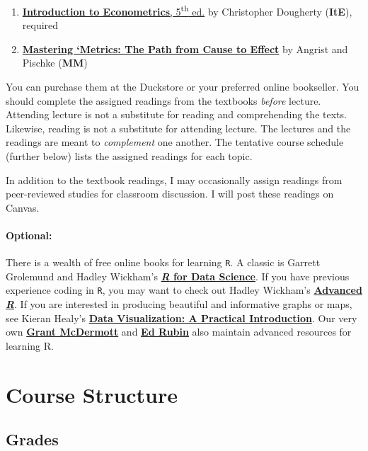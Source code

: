 \documentclass[10pt]{article}
\begin{document}
\begin{enumerate}
	\item \href{http://www.amazon.com/Introduction-Econometrics-Christopher-Dougherty/dp/0199676828/}{\textbf{Introduction to Econometrics}, 5\textsuperscript{th} ed.} by Christopher Dougherty (\textbf{ItE}), required
	\item \href{https://www.amazon.com/Mastering-Metrics-Path-Cause-Effect/dp/0691152845/}{\textbf{Mastering `Metrics: The Path from Cause to Effect}} by Angrist and Pischke (\textbf{MM})
\end{enumerate}
You can purchase them at the Duckstore or your preferred online bookseller. You should complete the assigned readings from the textbooks \textit{before} lecture. Attending lecture is not a substitute for reading and comprehending the texts. Likewise, reading is not a substitute for attending lecture. The lectures and the readings are meant to \textit{complement} one another. The tentative course schedule (further below) lists the assigned readings for each topic.

In addition to the textbook readings, I may occasionally assign readings from peer-reviewed studies for classroom discussion. I will post these readings on Canvas.

\paragraph{Optional:} 
There is a wealth of free online books for learning \texttt{R}. 
A classic is Garrett Grolemund and Hadley Wickham's \href{http://r4ds.had.co.nz}{\textbf{\textit{R} for Data Science}}. 
If you have previous experience coding in \texttt{R}, you may want to check out Hadley Wickham's \href{http://adv-r.had.co.nz/}{\textbf{Advanced \textit{R}}}. 
If you are interested in producing beautiful and informative graphs or maps, see Kieran Healy's \href{http://socviz.co/}{\textbf{Data Visualization: A Practical Introduction}}. 
Our very own \href{https://grantmcdermott.com/teaching/}{\textbf{Grant McDermott}} and \href{http://edrub.in/teaching.html}{\textbf{Ed Rubin}} also maintain advanced resources for learning R.

\newpage
\section*{Course Structure}

\subsection*{Grades}
\end{document}
